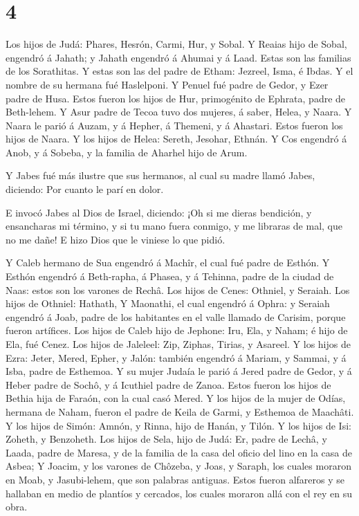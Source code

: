 \hypertarget{section-3}{%
\section{4}\label{section-3}}

 Los hijos de Judá: Phares, Hesrón, Carmi, Hur, y Sobal.
 Y Reaias hijo de Sobal, engendró á Jahath; y Jahath
engendró á Ahumai y á Laad. Estas son las familias de los Sorathitas.
 Y estas son las del padre de Etham: Jezreel, Isma, é Ibdas.
Y el nombre de su hermana fué Haslelponi.  Y Penuel fué
padre de Gedor, y Ezer padre de Husa. Estos fueron los hijos de Hur,
primogénito de Ephrata, padre de Beth-lehem.  Y Asur padre
de Tecoa tuvo dos mujeres, á saber, Helea, y Naara.  Y Naara
le parió á Auzam, y á Hepher, á Themeni, y á Ahastari. Estos fueron los
hijos de Naara.  Y los hijos de Helea: Sereth, Jesohar,
Ethnán.  Y Cos engendró á Anob, y á Sobeba, y la familia de
Aharhel hijo de Arum.

 Y Jabes fué más ilustre que sus hermanos, al cual su madre
llamó Jabes, diciendo: Por cuanto le parí en dolor.

 E invocó Jabes al Dios de Israel, diciendo: ¡Oh si me
dieras bendición, y ensancharas mi término, y si tu mano fuera conmigo,
y me libraras de mal, que no me dañe! E hizo Dios que le viniese lo que
pidió.

 Y Caleb hermano de Sua engendró á Machîr, el cual fué
padre de Esthón.  Y Esthón engendró á Beth-rapha, á Phasea,
y á Tehinna, padre de la ciudad de Naas: estos son los varones de Rechâ.
 Los hijos de Cenes: Othniel, y Seraiah. Los hijos de
Othniel: Hathath,  Y Maonathi, el cual engendró á Ophra: y
Seraiah engendró á Joab, padre de los habitantes en el valle llamado de
Carisim, porque fueron artífices.  Los hijos de Caleb hijo
de Jephone: Iru, Ela, y Naham; é hijo de Ela, fué Cenez. 
Los hijos de Jaleleel: Zip, Ziphas, Tirias, y Asareel.  Y
los hijos de Ezra: Jeter, Mered, Epher, y Jalón: también engendró á
Mariam, y Sammai, y á Isba, padre de Esthemoa.  Y su mujer
Judaía le parió á Jered padre de Gedor, y á Heber padre de Sochô, y á
Icuthiel padre de Zanoa. Estos fueron los hijos de Bethia hija de
Faraón, con la cual casó Mered.  Y los hijos de la mujer de
Odías, hermana de Naham, fueron el padre de Keila de Garmi, y Esthemoa
de Maachâti.  Y los hijos de Simón: Amnón, y Rinna, hijo de
Hanán, y Tilón. Y los hijos de Isi: Zoheth, y Benzoheth. 
Los hijos de Sela, hijo de Judá: Er, padre de Lechâ, y Laada, padre de
Maresa, y de la familia de la casa del oficio del lino en la casa de
Asbea;  Y Joacim, y los varones de Chôzeba, y Joas, y
Saraph, los cuales moraron en Moab, y Jasubi-lehem, que son palabras
antiguas.  Estos fueron alfareros y se hallaban en medio de
plantíos y cercados, los cuales moraron allá con el rey en su obra.

